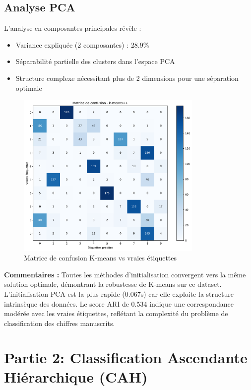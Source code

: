 \documentclass[12pt,a4paper]{article}
\begin{document}
\subsection{Analyse PCA}

L'analyse en composantes principales révèle :
\begin{itemize}
    \item Variance expliquée (2 composantes) : 28.9\%
    \item Séparabilité partielle des clusters dans l'espace PCA
    \item Structure complexe nécessitant plus de 2 dimensions pour une séparation optimale
\end{itemize}

\begin{figure}[H]
    \centering
    \includegraphics[width=0.8\textwidth]{exercice3_confusion_matrix.png}
    \caption{Matrice de confusion K-means vs vraies étiquettes}
    \label{fig:confusion_matrix}
\end{figure}

\textbf{Commentaires :} Toutes les méthodes d'initialisation convergent vers la même solution optimale, démontrant la robustesse de K-means sur ce dataset. L'initialisation PCA est la plus rapide (0.067s) car elle exploite la structure intrinsèque des données. Le score ARI de 0.534 indique une correspondance modérée avec les vraies étiquettes, reflétant la complexité du problème de classification des chiffres manuscrits.

\section{Partie 2: Classification Ascendante Hiérarchique (CAH)}
\end{document}

